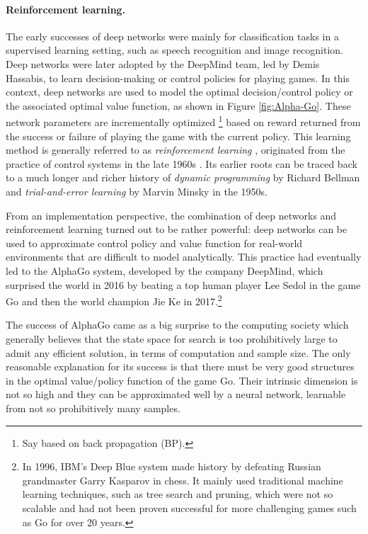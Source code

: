 \documentclass[../../book-main.tex]{subfiles}
\begin{document}
\paragraph{Reinforcement learning.}
The early successes of deep networks were mainly for classification tasks in a supervised learning setting, such as speech recognition and image recognition. Deep networks were later adopted by the DeepMind team, led by Demis Hassabis, to learn decision-making or control policies for playing games. In this context, deep networks are used to model the optimal decision/control policy or the associated optimal value function, as shown in Figure \ref{fig:Alpha-Go}. These network parameters are incrementally optimized \footnote{Say based on back propagation (BP).} based on reward returned from the success or failure of playing the game with the current policy. This learning method is generally referred to as {\em reinforcement learning} \cite{Sutton-Barto}, originated from the practice of control systems in the late 1960s \cite{Waltz1965AHA,Mendel1970ReinforcementlearningCA}. Its earlier roots can be traced back to a much longer and richer history of {\em dynamic programming} by Richard Bellman \cite{Bellman-DP} and {\em trial-and-error learning} by Marvin Minsky \cite{Minsky-1954} in the 1950s. 

From an implementation perspective, the combination of deep networks and reinforcement learning turned out to be rather powerful: deep networks can be used to approximate control policy and value function for real-world environments that are difficult to model analytically. This practice had eventually led to the AlphaGo system, developed by the company DeepMind, which surprised the world in 2016 by beating a top human player Lee Sedol in the game Go and then the world champion Jie Ke in 2017.\footnote{In 1996, IBM's Deep Blue system made history by defeating Russian grandmaster Garry Kasparov in chess. It mainly used traditional machine learning techniques, such as tree search and pruning, which were not so scalable and had not been proven successful for more challenging games such as Go for over 20 years.} 

The success of AlphaGo came as a big surprise to the computing society which generally believes that the state space for search is too prohibitively large to admit any efficient solution, in terms of computation and sample size. The only reasonable explanation for its success is that there must be very good structures in the optimal value/policy function of the game Go. Their intrinsic dimension is not so high and they can be approximated well by a neural network, learnable from not so prohibitively many samples. 
\end{document}

